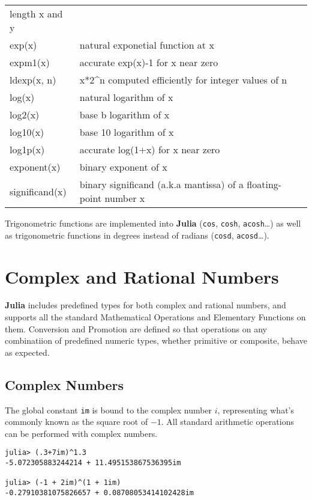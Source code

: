 \documentclass[
]{article}
\begin{document}
\begin{longtable}[]{@{}
  >{\raggedright\arraybackslash}p{}
  >{\centering\arraybackslash}p{}@{}}
length x and y \\
exp(x) & natural exponetial function at x \\
expm1(x) & accurate exp(x)-1 for x near zero \\
ldexp(x, n) & x*2\^{}n computed efficiently for integer values of n \\
log(x) & natural logarithm of x \\
log2(x) & base b logarithm of x \\
log10(x) & base 10 logarithm of x \\
log1p(x) & accurate log(1+x) for x near zero \\
exponent(x) & binary exponent of x \\
significand(x) & binary significand (a.k.a mantissa) of a floating-point
number x \\
\end{longtable}

Trigonometric functions are implemented into \textbf{Julia}
(\texttt{cos}, \texttt{cosh}, \texttt{acosh}\ldots) as well as
trigonometric functions in degrees instead of radians (\texttt{cosd},
\texttt{acosd}\ldots).

\newpage

\hypertarget{complex-and-rational-numbers}{%
\section{Complex and Rational
Numbers}\label{complex-and-rational-numbers}}

\textbf{Julia} includes predefined types for both complex and rational
numbers, and supports all the standard Mathematical Operations and
Elementary Functions on them. Conversion and Promotion are defined so
that operations on any combinatiion of predefined numeric types, whether
primitive or composite, behave as expected.

\hypertarget{complex-numbers}{%
\subsection{Complex Numbers}\label{complex-numbers}}

The global constant \texttt{im} is bound to the complex number \(i\),
representing what's commonly known as the square root of \(-1\). All
standard arithmetic operations can be performed with complex numbers.

\begin{verbatim}
julia> (.3+7im)^1.3
-5.072305883244214 + 11.495153867536395im

julia> (-1 + 2im)^(1 + 1im)
-0.27910381075826657 + 0.08708053414102428im
\end{verbatim}
\end{document}
